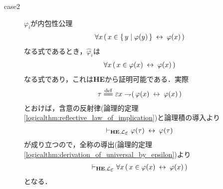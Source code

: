 \begin{metaprf}
\begin{description}
			\item[case2] $\varphi_{i}$が内包性公理
				\begin{align}
					\forall x\, (\, x \in \{\, y \mid \varphi(y)\, \} \hspace{0.25em}\leftrightarrow\hspace{0.25em} \varphi(x)\, )
				\end{align}
				なる式であるとき，$\hat{\varphi}_{i}$は
				\begin{align}
					\forall x\, (\, x \in \varphi(x) \hspace{0.25em}\leftrightarrow\hspace{0.25em} \varphi(x)\, )
				\end{align}
				なる式であり，これは{\bf HE}から証明可能である．実際
				\begin{align}
					\tau \defeq \varepsilon x \negation (\, \varphi(x) \lrarrow \varphi(x)\, )
				\end{align}
				とおけば，含意の反射律(論理的定理\ref{logicalthm:reflective_law_of_implication})と論理積の導入より
				\begin{align}
					\provable{\mbox{{\bf HE}},\lang{\varepsilon}} \varphi(\tau) \lrarrow \varphi(\tau)
				\end{align}
				が成り立つので，全称の導出(論理的定理\ref{logicalthm:derivation_of_universal_by_epsilon})より
				\begin{align}
					\provable{\mbox{{\bf HE}},\lang{\varepsilon}} \forall x\, (\, x \in \varphi(x) \lrarrow \varphi(x)\, )
				\end{align}
				となる．
			

\end{description}
\end{metaprf}
